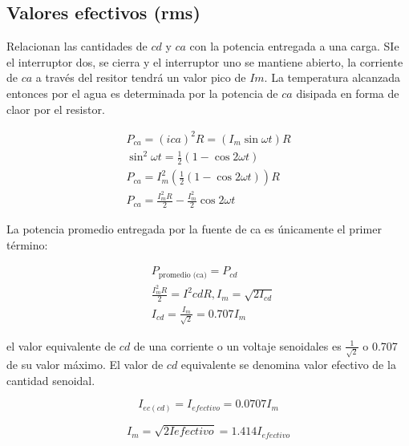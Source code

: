 \begin{definition}

\end{definition}


\subsection{Valores efectivos (rms)}

Relacionan las cantidades de $cd$ y $ca$ con la potencia entregada a una carga. SIe el interruptor dos, se
cierra y el interruptor uno se mantiene abierto, la corriente de $ca$ a través del resitor tendrá un valor pico de $Im$.
La temperatura alcanzada entonces por el agua es determinada por la potencia de $ca$ disipada en forma de claor por el resistor.


\begin{align*}
	P_{ca}=\left(i{ca}\right)^2R=\left(I_{m}\sin{\omega t} \right)R       \\
	\sin^2{\omega t}=\frac{1}{2}\left(1-\cos{2\omega t}\right)            \\
	P_{ca}=I_{m}^2\left(\frac{1}{2}\left(1-\cos{2\omega t}\right)\right)R \\
	P_{ca}=\frac{I_{m}^2R}{2}-\frac{I_{m}^2}{2}\cos{2\omega t}
\end{align*}

La potencia promedio entregada por la fuente de ca es únicamente el primer término:

\begin{align*}
	 & P_{\text{promedio (ca)}}=P_{cd}                   \\
	 & \frac{I^2_{m}R}{2}=I^2{cd}R, I_{m}=\sqrt{2I_{cd}} \\
	 & I_{cd}=\frac{I_{m}}{\sqrt{2}}=0.707I_{m}
\end{align*}

el valor equivalente de $cd$ de una corriente o un voltaje senoidales es $\frac{1}{\sqrt{2}}$ o 0.707 de su valor
máximo. El valor de $cd$ equivalente se denomina valor efectivo de la cantidad senoidal.

\begin{equation}
	I_{ec(cd)}=I_{efectivo}=0.0707I_{m}
\end{equation}

\begin{equation}
	I_{m}=\sqrt{2I{efectivo}}=1.414I_{efectivo}
\end{equation}

